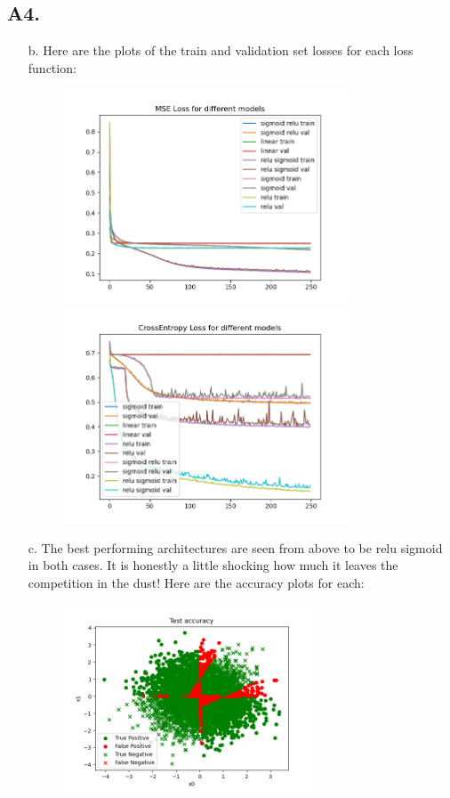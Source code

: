 \documentclass[12pt]{article}
\theoremstyle{definitionstyle}
\begin{document}
    \subsection*{A4.}
    \begin{enumerate}
        \item[b.] Here are the plots of the train and validation set losses for each loss function:
        \begin{figure}[H]
            \centering
            \includegraphics[width=0.8\textwidth]{mse_images.png}
            \includegraphics*[width=0.8\textwidth]{ce_images.png}
        \end{figure}
        \item[c.] The best performing architectures are seen from above to be relu sigmoid in both cases. It is honestly a little shocking how much it leaves the competition in the dust! Here are the accuracy plots for each:
        \begin{figure}[H]
            \centering
            \includegraphics[width=0.7\textwidth]{mse_acc.png}

\end{figure}
\end{enumerate}
\end{document}
